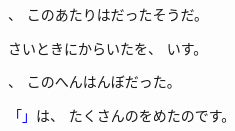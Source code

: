 \documentclass{minimal}
\begin{document}
\textcolor{blue}{}、
このあたりはだったそうだ。

さいときにからいた\textcolor{blue}{}を、
いす。

\textcolor{blue}{}、
このへんはんぼだった。

\textcolor{blue}{「」}は、
たくさんのをめたのです。
\end{document}

